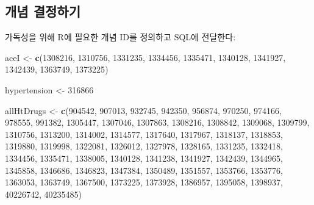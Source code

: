 \documentclass[10.5pt]{book}
\newenvironment{Shaded}{\begin{snugshade}}{\end{snugshade}}
\newcommand{\KeywordTok}[1]{\textcolor[rgb]{0.13,0.29,0.53}{\textbf{#1}}}
\newcommand{\DecValTok}[1]{\textcolor[rgb]{0.00,0.00,0.81}{#1}}
\newcommand{\StringTok}[1]{\textcolor[rgb]{0.31,0.60,0.02}{#1}}
\newcommand{\NormalTok}[1]{#1}
\theoremstyle{definition}
\theoremstyle{definition}
\theoremstyle{definition}
\theoremstyle{remark}
\begin{document}
\subsection{개념 결정하기}\label{-}

가독성을 위해 R에 필요한 개념 ID를 정의하고 SQL에 전달한다:

\begin{Shaded}
\begin{Highlighting}[]
\NormalTok{aceI <-}\StringTok{ }\KeywordTok{c}\NormalTok{(}\DecValTok{1308216}\NormalTok{, }\DecValTok{1310756}\NormalTok{, }\DecValTok{1331235}\NormalTok{, }\DecValTok{1334456}\NormalTok{, }\DecValTok{1335471}\NormalTok{, }\DecValTok{1340128}\NormalTok{, }\DecValTok{1341927}\NormalTok{,}
          \DecValTok{1342439}\NormalTok{, }\DecValTok{1363749}\NormalTok{, }\DecValTok{1373225}\NormalTok{)}

\NormalTok{hypertension <-}\StringTok{ }\DecValTok{316866}

\NormalTok{allHtDrugs <-}\StringTok{ }\KeywordTok{c}\NormalTok{(}\DecValTok{904542}\NormalTok{, }\DecValTok{907013}\NormalTok{, }\DecValTok{932745}\NormalTok{, }\DecValTok{942350}\NormalTok{, }\DecValTok{956874}\NormalTok{, }\DecValTok{970250}\NormalTok{, }\DecValTok{974166}\NormalTok{,}
                  \DecValTok{978555}\NormalTok{, }\DecValTok{991382}\NormalTok{, }\DecValTok{1305447}\NormalTok{, }\DecValTok{1307046}\NormalTok{, }\DecValTok{1307863}\NormalTok{, }\DecValTok{1308216}\NormalTok{,}
                  \DecValTok{1308842}\NormalTok{, }\DecValTok{1309068}\NormalTok{, }\DecValTok{1309799}\NormalTok{, }\DecValTok{1310756}\NormalTok{, }\DecValTok{1313200}\NormalTok{, }\DecValTok{1314002}\NormalTok{,}
                  \DecValTok{1314577}\NormalTok{, }\DecValTok{1317640}\NormalTok{, }\DecValTok{1317967}\NormalTok{, }\DecValTok{1318137}\NormalTok{, }\DecValTok{1318853}\NormalTok{, }\DecValTok{1319880}\NormalTok{,}
                  \DecValTok{1319998}\NormalTok{, }\DecValTok{1322081}\NormalTok{, }\DecValTok{1326012}\NormalTok{, }\DecValTok{1327978}\NormalTok{, }\DecValTok{1328165}\NormalTok{, }\DecValTok{1331235}\NormalTok{,}
                  \DecValTok{1332418}\NormalTok{, }\DecValTok{1334456}\NormalTok{, }\DecValTok{1335471}\NormalTok{, }\DecValTok{1338005}\NormalTok{, }\DecValTok{1340128}\NormalTok{, }\DecValTok{1341238}\NormalTok{,}
                  \DecValTok{1341927}\NormalTok{, }\DecValTok{1342439}\NormalTok{, }\DecValTok{1344965}\NormalTok{, }\DecValTok{1345858}\NormalTok{, }\DecValTok{1346686}\NormalTok{, }\DecValTok{1346823}\NormalTok{,}
                  \DecValTok{1347384}\NormalTok{, }\DecValTok{1350489}\NormalTok{, }\DecValTok{1351557}\NormalTok{, }\DecValTok{1353766}\NormalTok{, }\DecValTok{1353776}\NormalTok{, }\DecValTok{1363053}\NormalTok{,}
                  \DecValTok{1363749}\NormalTok{, }\DecValTok{1367500}\NormalTok{, }\DecValTok{1373225}\NormalTok{, }\DecValTok{1373928}\NormalTok{, }\DecValTok{1386957}\NormalTok{, }\DecValTok{1395058}\NormalTok{,}
                  \DecValTok{1398937}\NormalTok{, }\DecValTok{40226742}\NormalTok{, }\DecValTok{40235485}\NormalTok{)}
\end{Highlighting}
\end{Shaded}
\end{document}
